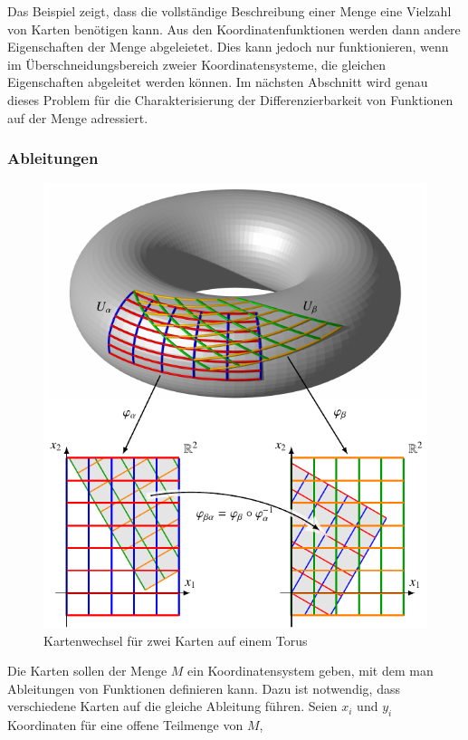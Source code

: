 Das Beispiel zeigt, dass die vollständige Beschreibung einer Menge
eine Vielzahl von Karten benötigen kann.
Aus den Koordinatenfunktionen werden dann andere Eigenschaften der
Menge abgeleietet.
Dies kann jedoch nur funktionieren, wenn im Überschneidungsbereich
zweier Koordinatensysteme, die gleichen Eigenschaften abgeleitet
werden können.
Im nächsten Abschnitt wird genau dieses Problem für die
Charakterisierung der Differenzierbarkeit von Funktionen auf der
Menge adressiert.

%
%
\subsubsection{Ableitungen}
\begin{figure}
\centering
\includegraphics{chapters/030-gruppen/images/karten.pdf}
\caption{Kartenwechsel für zwei Karten auf einem Torus
\label{buch:gruppen:gruppe:fig:kartenwechsel}}
\end{figure}
Die Karten sollen der Menge $M$ ein Koordinatensystem geben, mit dem
man Ableitungen von Funktionen definieren kann.
Dazu ist notwendig, dass verschiedene Karten auf die gleiche
Ableitung führen.
Seien $x_i$ und $y_i$ Koordinaten für eine offene Teilmenge von $M$,

